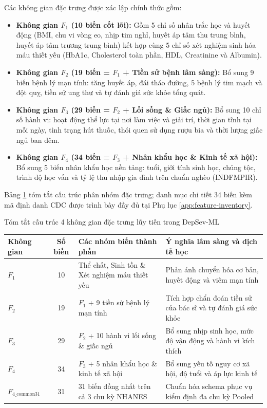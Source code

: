 Các không gian đặc trưng được xác lập chính thức gồm:
\begin{itemize}
    \item \textbf{Không gian $F_1$ (10 biến cốt lõi):} Gồm 5 chỉ số nhân trắc học và huyết động (BMI, chu vi vòng eo, nhịp tim nghỉ, huyết áp tâm thu trung bình, huyết áp tâm trương trung bình) kết hợp cùng 5 chỉ số xét nghiệm sinh hóa máu thiết yếu (HbA1c, Cholesterol toàn phần, HDL, Creatinine và Albumin).
    \item \textbf{Không gian $F_2$ (19 biến = $F_1$ + Tiền sử bệnh lâm sàng):} Bổ sung 9 biến bệnh lý mạn tính: tăng huyết áp, đái tháo đường, 5 bệnh lý tim mạch và đột quỵ, tiền sử ung thư và tự đánh giá sức khỏe tổng quát.
    \item \textbf{Không gian $F_3$ (29 biến = $F_2$ + Lối sống \& Giấc ngủ):} Bổ sung 10 chỉ số hành vi: hoạt động thể lực tại nơi làm việc và giải trí, thời gian tĩnh tại mỗi ngày, tình trạng hút thuốc, thói quen sử dụng rượu bia và thời lượng giấc ngủ ban đêm.
    \item \textbf{Không gian $F_4$ (34 biến = $F_3$ + Nhân khẩu học \& Kinh tế xã hội):} Bổ sung 5 biến nhân khẩu học nền tảng: tuổi, giới tính sinh học, chủng tộc, trình độ học vấn và tỷ lệ thu nhập gia đình trên chuẩn nghèo (INDFMPIR).
\end{itemize}

Bảng \ref{tab:feature-summary} tóm tắt cấu trúc phân nhóm đặc trưng; danh mục chi tiết 34 biến kèm mã định danh CDC được trình bày đầy đủ tại Phụ lục \ref{app:feature-inventory}.

\begin{table}{Tóm tắt cấu trúc 4 không gian đặc trưng lũy tiến trong DepSev-ML}
\centering
\footnotesize
\setlength{\tabcolsep}{4pt}
\label{tab:feature-summary}
\begin{tabularx}{\textwidth}{l c p{5.5cm} X}
\toprule
\textbf{Không gian} & \textbf{Số biến} & \textbf{Các nhóm biến thành phần} & \textbf{Ý nghĩa lâm sàng và dịch tễ học} \\
\midrule
$F_1$ & 10 & Thể chất, Sinh tồn \& Xét nghiệm máu thiết yếu & Phản ánh chuyển hóa cơ bản, huyết động và viêm mạn tính \\
$F_2$ & 19 & $F_1$ + 9 tiền sử bệnh lý mạn tính & Tích hợp chẩn đoán tiền sử của bác sĩ và tự đánh giá sức khỏe \\
$F_3$ & 29 & $F_2$ + 10 hành vi lối sống \& giấc ngủ & Bổ sung nhịp sinh học, mức độ vận động và hành vi kích thích \\
$F_4$ & 34 & $F_3$ + 5 nhân khẩu học \& kinh tế xã hội & Bổ sung yếu tố nguy cơ xã hội, độ tuổi và áp lực kinh tế \\
\midrule
$F_{4\_\text{common31}}$ & 31 & 31 biến đồng nhất trên cả 3 chu kỳ NHANES & Chuẩn hóa schema phục vụ kiểm định đa chu kỳ Pooled \\
\bottomrule
\end{tabularx}
\end{table}

